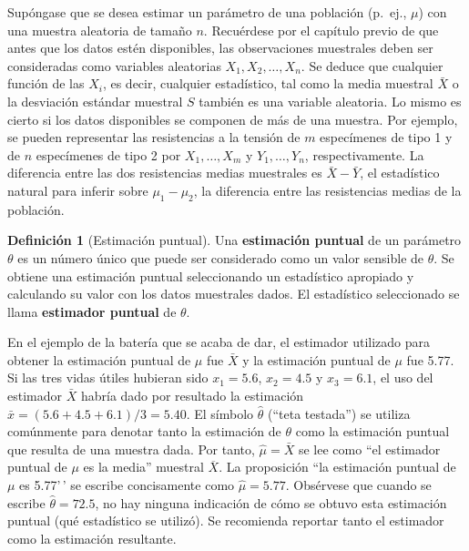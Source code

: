 \documentclass[
  11pt,
]{book}
\theoremstyle{definition}
\newtheorem{definition}{Definición}[chapter]
\theoremstyle{definition}
\theoremstyle{definition}
\theoremstyle{definition}
\theoremstyle{remark}
\begin{document}
Supóngase que se desea estimar un parámetro de una población (p.~ej., \(\mu\)) con una muestra aleatoria de tamaño \(n\). Recuérdese por el capítulo previo de que antes que los datos estén disponibles, las observaciones muestrales deben ser consideradas como variables aleatorias \(X_1, X_2, \ldots, X_n\). Se deduce que cualquier función de las \(X_i\), es decir, cualquier estadístico, tal como la media muestral \(\bar{X}\) o la desviación estándar muestral \(S\) también es una variable aleatoria. Lo mismo es cierto si los datos disponibles se componen de más de una muestra. Por ejemplo, se pueden representar las resistencias a la tensión de \(m\) especímenes de tipo 1 y de \(n\) especímenes de tipo 2 por \(X_1, \ldots, X_m\) y \(Y_1, \ldots, Y_n\), respectivamente. La diferencia entre las dos resistencias medias muestrales es \(\bar{X} - \bar{Y}\), el estadístico natural para inferir sobre \(\mu_1 - \mu_2\), la diferencia entre las resistencias medias de la población.

\begin{definition}[Estimación puntual]
Una \textbf{estimación puntual} de un parámetro \(\theta\) es un número único que puede ser considerado como un valor sensible de \(\theta\). Se obtiene una estimación puntual seleccionando un estadístico apropiado y calculando su valor con los datos muestrales dados. El estadístico seleccionado se llama \textbf{estimador puntual} de \(\theta\).
\end{definition}

En el ejemplo de la batería que se acaba de dar, el estimador utilizado para obtener la estimación puntual de \(\mu\) fue \(\bar{X}\) y la estimación puntual de \(\mu\) fue 5.77. Si las tres vidas útiles hubieran sido \(x_1 = 5.6\), \(x_2 = 4.5\) y \(x_3 = 6.1\), el uso del estimador \(\bar{X}\) habría dado por resultado la estimación \(\bar{x} = (5.6 + 4.5 + 6.1)/3 = 5.40\). El símbolo \(\hat{\theta}\) (``teta testada'') se utiliza comúnmente para denotar tanto la estimación de \(\theta\) como la estimación puntual que resulta de una muestra dada. Por tanto, \(\hat{\mu} = \bar{X}\) se lee como ``el estimador puntual de \(\mu\) es la media'' muestral \(\overline{X}\). La proposición ``la estimación puntual de \(\mu\) es 5.77'\,' se escribe concisamente como \(\hat{\mu} = 5.77\). Obsérvese que cuando se escribe \(\hat{\theta} = 72.5\), no hay ninguna indicación de cómo se obtuvo esta estimación puntual (qué estadístico se utilizó). Se recomienda reportar tanto el estimador como la estimación resultante.
\end{document}
